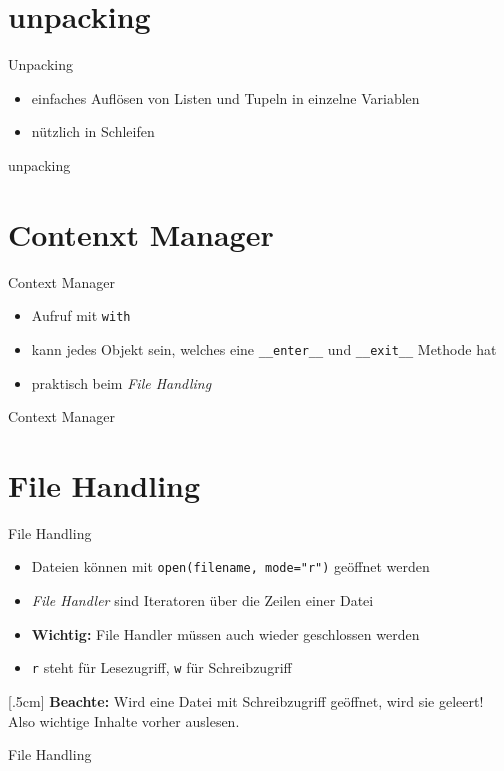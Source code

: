 \section{unpacking}
\begin{frame}{Unpacking}
\begin{itemize}
	\item einfaches Aufl\"osen von Listen und Tupeln in einzelne Variablen
	\item n\"utzlich in  Schleifen
\end{itemize}
\end{frame}
\begin{frame}{unpacking}
	
\end{frame}

\section{Contenxt Manager}
\begin{frame}{Context Manager}
\begin{itemize}
	\item Aufruf mit \texttt{with}
	\item kann jedes Objekt sein, welches eine \texttt{__enter__} und \texttt{__exit__} Methode hat
	\item praktisch beim \textit{File Handling}
\end{itemize}
\end{frame}
\begin{frame}{Context Manager}
	
\end{frame}

\section{File Handling}
\begin{frame}{File Handling}
\begin{itemize}
	\item Dateien k\"onnen mit \texttt{open(filename, mode="r")} ge\"offnet werden
	\item \textit{File Handler} sind Iteratoren \"uber die Zeilen einer Datei
	\item \textbf{Wichtig:} File Handler m\"ussen auch wieder geschlossen werden
	\item \texttt{r} steht f\"ur Lesezugriff,  \texttt{w} f\"ur Schreibzugriff
\end{itemize}[.5cm]
\textbf{Beachte:} Wird eine Datei mit Schreibzugriff ge\"offnet, wird sie geleert! Also wichtige Inhalte vorher auslesen.
\end{frame}
\begin{frame}{File Handling}
	
\end{frame}


